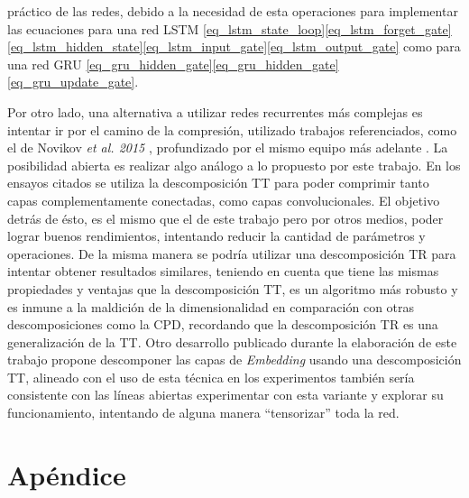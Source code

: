 \documentclass[spanish]{article}
\theoremstyle{definition}
\theoremstyle{remark}
\numberwithin{equation}{section}
\numberwithin{equation}{section} %
\begin{document}
práctico de las redes, debido a la necesidad de esta operaciones para implementar las ecuaciones para una red LSTM \eqref{eq_lstm_state_loop}\eqref{eq_lstm_forget_gate}\eqref{eq_lstm_hidden_state}\eqref{eq_lstm_input_gate}\eqref{eq_lstm_output_gate} como para una red GRU \eqref{eq_gru_hidden_gate}\eqref{eq_gru_hidden_gate}\eqref{eq_gru_update_gate}.
\par
Por otro lado, una alternativa a utilizar redes recurrentes más complejas es intentar ir por el camino de la compresión, utilizado trabajos referenciados, como el de Novikov \textit{et al. 2015} \cite{novikov2015tensorizing}, profundizado por el mismo equipo más adelante \cite{garipov2016ultimate}. La posibilidad abierta es realizar algo análogo a lo propuesto por este trabajo. En los ensayos citados se utiliza la descomposición TT para poder comprimir tanto capas complementamente conectadas, como capas convolucionales. El objetivo detrás de ésto, es el mismo que el de este trabajo pero por otros medios, poder lograr buenos rendimientos, intentando reducir la cantidad de parámetros y operaciones. De la misma manera se podría utilizar una descomposición TR para intentar obtener resultados similares, teniendo en cuenta que tiene las mismas propiedades y ventajas que la descomposición TT, es un algoritmo más robusto y es inmune a la maldición de la dimensionalidad en comparación con otras descomposiciones como la CPD, recordando que la descomposición TR es una generalización de la TT. Otro desarrollo publicado durante la elaboración de este trabajo \cite{khrulkov2019tensorized} propone descomponer las capas de \textit{Embedding} usando una descomposición TT, alineado con el uso de esta técnica en los experimentos también sería consistente con las líneas abiertas experimentar con esta variante y explorar su funcionamiento, intentando de alguna manera ``tensorizar'' toda la red.  
\par

\clearpage
 

\clearpage

\appendix
\section{Apéndice}\label{appendix_a}
\end{document}
